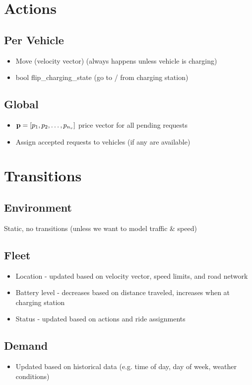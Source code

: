 \documentclass[12pt]{article}
\begin{document}
\newpage
\section*{Actions}
\subsection*{Per Vehicle}
\begin{itemize}
		\item Move (velocity vector) (always happens unless vehicle is charging)
		\item bool flip\_charging\_state (go to / from charging station)
\end{itemize}

\subsection*{Global}
\begin{itemize}
		\item $\mathbf{p} = [p_1, p_2, \ldots, p_{n_v}]$ price vector for all pending requests
		\item Assign accepted requests to vehicles (if any are available)
\end{itemize}

\section*{Transitions}
\subsection*{Environment}
Static, no transitions (unless we want to model traffic \& speed)
\subsection*{Fleet}
\begin{itemize}
		\item Location - updated based on velocity vector, speed limits, and road network
		\item Battery level - decreases based on distance traveled, increases when at charging station
		\item Status - updated based on actions and ride assignments
\end{itemize}
\subsection*{Demand}
\begin{itemize}
		\item Updated based on historical data (e.g. time of day, day of week, weather conditions)
\end{itemize}
\end{document}
